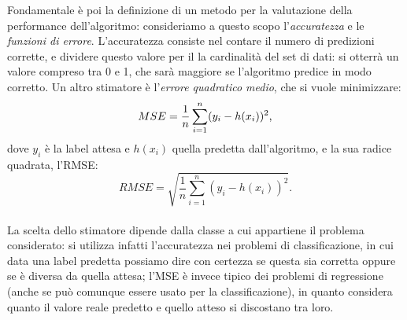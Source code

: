 \documentclass[oneside, openany]{book}
\begin{document}
		Fondamentale è poi la definizione di un metodo per la valutazione della performance dell'algoritmo: consideriamo a questo scopo l'\textit{accuratezza} e le \textit{funzioni di errore}. L'accuratezza consiste nel contare il numero di predizioni corrette, e dividere questo valore per il la cardinalità del set di dati: si otterrà un valore compreso tra 0 e 1, che sarà maggiore se l'algoritmo predice in modo corretto. Un altro stimatore è l'\textit{errore quadratico medio}, che si vuole minimizzare:\\
		\[
		MSE={1\over n}\sum_{i=1}^n (y_i-h(x_i))^2\text{,}
		\]
		dove $y_i$ è la label attesa e $h(x_i)$ quella predetta dall'algoritmo, e la sua radice quadrata, l'RMSE:\\
		\[
		RMSE = \sqrt{\frac{1}{n}\sum_{i=1}^{n}(y_{i} - h(x_{i}))^{2}}\text{.}
		\]\\
		La scelta dello stimatore dipende dalla classe a cui appartiene il problema considerato: si utilizza infatti l'accuratezza nei problemi di classificazione, in cui data una label predetta possiamo dire con certezza se questa sia corretta oppure se è diversa da quella attesa; l'MSE è invece tipico dei problemi di regressione (anche se può comunque essere usato per la classificazione), in quanto considera quanto il valore reale predetto e quello atteso si discostano tra loro.
		
\end{document}

